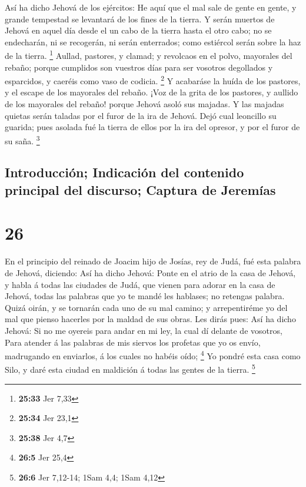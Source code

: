  Así ha dicho Jehová de los ejércitos: He aquí que el mal
sale de gente en gente, y grande tempestad se levantará de los fines de
la tierra.  Y serán muertos de Jehová en aquel día desde el
un cabo de la tierra hasta el otro cabo; no se endecharán, ni se
recogerán, ni serán enterrados; como estiércol serán sobre la haz de la
tierra. \footnote{\textbf{25:33} Jer 7,33}  Aullad,
pastores, y clamad; y revolcaos en el polvo, mayorales del rebaño;
porque cumplidos son vuestros días para ser vosotros degollados y
esparcidos, y caeréis como vaso de codicia. \footnote{\textbf{25:34} Jer
  23,1}  Y acabaráse la huída de los pastores, y el escape
de los mayorales del rebaño.  ¡Voz de la grita de los
pastores, y aullido de los mayorales del rebaño! porque Jehová asoló sus
majadas.  Y las majadas quietas serán taladas por el furor
de la ira de Jehová.  Dejó cual leoncillo su guarida; pues
asolada fué la tierra de ellos por la ira del opresor, y por el furor de
su saña. \footnote{\textbf{25:38} Jer 4,7}

\hypertarget{introducciuxf3n-indicaciuxf3n-del-contenido-principal-del-discurso-captura-de-jeremuxedas}{%
\subsection{Introducción; Indicación del contenido principal del
discurso; Captura de
Jeremías}\label{introducciuxf3n-indicaciuxf3n-del-contenido-principal-del-discurso-captura-de-jeremuxedas}}

\hypertarget{section-25}{%
\section{26}\label{section-25}}

 En el principio del reinado de Joacim hijo de Josías, rey
de Judá, fué esta palabra de Jehová, diciendo:  Así ha dicho
Jehová: Ponte en el atrio de la casa de Jehová, y habla á todas las
ciudades de Judá, que vienen para adorar en la casa de Jehová, todas las
palabras que yo te mandé les hablases; no retengas palabra. 
Quizá oirán, y se tornarán cada uno de su mal camino; y arrepentiréme yo
del mal que pienso hacerles por la maldad de sus obras.  Les
dirás pues: Así ha dicho Jehová: Si no me oyereis para andar en mi ley,
la cual dí delante de vosotros,  Para atender á las palabras
de mis siervos los profetas que yo os envío, madrugando en enviarlos, á
los cuales no habéis oído; \footnote{\textbf{26:5} Jer 25,4}
 Yo pondré esta casa como Silo, y daré esta ciudad en
maldición á todas las gentes de la tierra. \footnote{\textbf{26:6} Jer
  7,12-14; 1Sam 4,4; 1Sam 4,12}

